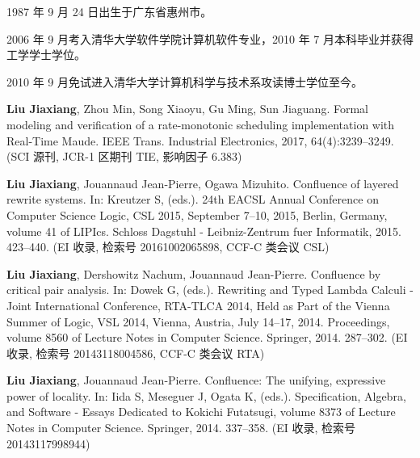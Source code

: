 \begin{resume}


  1987 年 9 月 24 日出生于广东省惠州市。

  2006 年 9 月考入清华大学软件学院计算机软件专业，2010 年 7 月本科毕业并获得工学学士学位。

  2010 年 9 月免试进入清华大学计算机科学与技术系攻读博士学位至今。


  \begin{publications}
    \item 
    \textbf{Liu Jiaxiang}, Zhou Min, Song Xiaoyu, Gu Ming, Sun Jiaguang. 
    Formal modeling and verification of a rate-monotonic scheduling implementation with Real-Time Maude. 
    IEEE Trans. Industrial Electronics, 2017, 64(4):3239--3249.
    (SCI 源刊, JCR-1 区期刊 TIE, 影响因子 6.383)

    \item 
    \textbf{Liu Jiaxiang}, Jouannaud Jean-Pierre, Ogawa Mizuhito. 
    Confluence of layered rewrite systems. 
    In: Kreutzer S, (eds.). 24th EACSL Annual Conference on Computer Science  Logic, CSL 2015, September 7--10, 2015, Berlin, Germany, volume 41 of  LIPIcs. Schloss Dagstuhl - Leibniz-Zentrum fuer Informatik, 2015. 423--440. 
    (EI 收录, 检索号 20161002065898, CCF-C 类会议 CSL) 

    \item 
    \textbf{Liu Jiaxiang}, Dershowitz Nachum, Jouannaud Jean-Pierre. 
    Confluence by critical pair analysis. 
    In: Dowek G, (eds.). Rewriting and Typed Lambda Calculi - Joint  International Conference, RTA-TLCA 2014, Held as Part of the Vienna Summer  of Logic, VSL 2014, Vienna, Austria, July 14--17, 2014. Proceedings, volume  8560 of Lecture Notes in Computer Science. Springer, 2014. 287--302. 
    (EI 收录, 检索号 20143118004586, CCF-C 类会议 RTA)

    \item 
    \textbf{Liu Jiaxiang}, Jouannaud Jean-Pierre. 
    Confluence: The unifying, expressive power of locality. 
    In: Iida S, Meseguer J, Ogata K, (eds.). Specification, Algebra, and Software - Essays Dedicated to Kokichi Futatsugi, volume 8373 of Lecture  Notes in Computer Science. Springer, 2014. 337--358. 
    (EI 收录, 检索号 20143117998944)
  \end{publications}


\end{resume}
